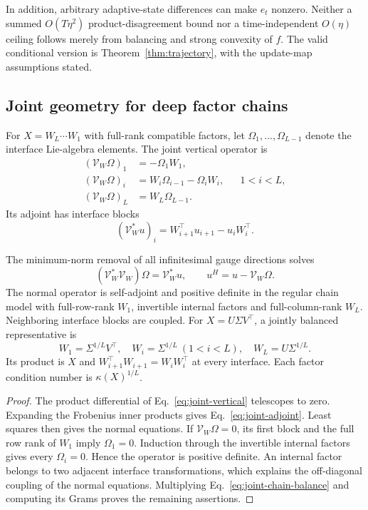 In addition, arbitrary adaptive-state differences can make $e_t$ nonzero.
Neither a summed $O(T\eta^2)$ product-disagreement bound nor a
time-independent $O(\eta)$ ceiling follows merely from balancing and
strong convexity of $f$. The valid conditional version is
Theorem~\ref{thm:trajectory}, with the update-map assumptions stated.

\subsection{Joint geometry for deep factor chains}
For $X=W_L\cdots W_1$ with full-rank compatible factors, let
$\Omega_1,\ldots,\Omega_{L-1}$ denote the interface Lie-algebra elements.
The joint vertical operator is
\begin{align}
 (\mathcal V_W\Omega)_1&=-\Omega_1W_1,\\
 (\mathcal V_W\Omega)_i&=W_i\Omega_{i-1}-\Omega_iW_i,
                      &&1<i<L,\\
 (\mathcal V_W\Omega)_L&=W_L\Omega_{L-1}.
 \label{eq:joint-vertical}
\end{align}
Its adjoint has interface blocks
\begin{equation}
 (\mathcal V_W^*u)_i=W_{i+1}^\top u_{i+1}-u_iW_i^\top.
 \label{eq:joint-adjoint}
\end{equation}

\begin{proposition}
\label{prop:joint-chain}
The minimum-norm removal of all infinitesimal gauge directions solves
\begin{equation}
 (\mathcal V_W^*\mathcal V_W)\Omega=\mathcal V_W^*u,
 \qquad u^{H}=u-\mathcal V_W\Omega.
 \label{eq:joint-normal}
\end{equation}
The normal operator is self-adjoint and positive definite in the regular
chain model with full-row-rank $W_1$, invertible internal factors and
full-column-rank $W_L$. Neighboring interface blocks are coupled.
For $X=U\Sigma V^\top$, a jointly balanced representative is
\begin{equation}
 W_1=\Sigma^{1/L}V^\top,\quad
 W_i=\Sigma^{1/L}\ (1<i<L),\quad
 W_L=U\Sigma^{1/L}.
 \label{eq:joint-chain-balance}
\end{equation}
Its product is $X$ and $W_{i+1}^\top W_{i+1}=W_iW_i^\top$ at every
interface. Each factor condition number is $\kappa(X)^{1/L}$.
\end{proposition}
\begin{proof}
The product differential of Eq.~\eqref{eq:joint-vertical} telescopes to
zero. Expanding the Frobenius inner products gives
Eq.~\eqref{eq:joint-adjoint}. Least squares then gives the normal equations.
If $\mathcal V_W\Omega=0$, its first block and the full row rank of
$W_1$ imply $\Omega_1=0$. Induction through the invertible internal
factors gives every $\Omega_i=0$. Hence the operator is positive definite.
An internal factor belongs to two adjacent interface transformations,
which explains the off-diagonal coupling of the normal equations.
Multiplying Eq.~\eqref{eq:joint-chain-balance} and computing its Grams
proves the remaining assertions.
\end{proof}


